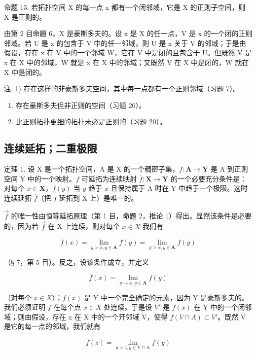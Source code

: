 命题 13. 若拓扑空间 X 的每一点 x 都有一个闭邻域，它是 X 的正则子空间，则 X 是正则的。

由第 2 目命题 6，X 是豪斯多夫的。设 x 是 X 的任一点，V 是 x 的一个闭的正则邻域。若 U 是 x 的包含于 V 中的任一邻域，则 U 是 x 关于 V 的邻域；于是由假设，存在 x 在 V 中的一个邻域 W，它在 V 中是闭的且包含于 U。但既然 V 是 x 在 X 中的邻域，W 就是 x 在 X 中的邻域；又既然 V 在 X 中是闭的，W 就在 X 中是闭的。

注. 1) 存在这样的非豪斯多夫空间，其中每一点都有一个正则邻域（习题 7）。

\begin{enumerate}
\def\labelenumi{\arabic{enumi})}
\setcounter{enumi}{1}
\item
  存在豪斯多夫但非正则的空间（习题 20）。
\item
  比正则拓扑更细的拓扑未必是正则的（习题 20）。
\end{enumerate}

\subsection{连续延拓；二重极限}

定理 1. 设 X 是一个拓扑空间，A 是 X 的一个稠密子集，\(f: \mathbf{A} \to \mathbf{Y}\) 是 A 到正则空间 Y 中的一个映射。\(f\) 可延拓为连续映射 \(\overline{f}: \mathbf{X} \to \mathbf{Y}\) 的一个必要充分条件是：对每个 \(x \in \mathbf{X}\)，\(f(y)\) 当 \(y\) 趋于 \(x\) 且保持属于 A 时在 Y 中趋于一个极限。这时连续延拓 \(\overline{f}\)（把 \(f\) 延拓到 X 上）是唯一的。

\(\vec{f}\) 的唯一性由恒等延拓原理（第 1 目，命题 2，推论 1）得出。显然该条件是必要的，因为若 \(\vec{f}\) 在 X 上连续，则对每个 \(x \in X\) 我们有

\[
\overline {{f}} (x) = \lim _ {y > x, y \in \mathbf {A}} \overline {{f}} (y) = \lim _ {y > x, y \in \mathbf {A}} f (y)
\]

（§ 7，第 5 目）。反之，设该条件成立，并定义

\[
\overline {{f}} (x) = \lim _ {y \rightarrow x, y \in \mathbf {A}} f (y)
\]

（对每个 \(x \in X\)）；\(\overline{f}(x)\) 是 Y 中一个完全确定的元素，因为 Y 是豪斯多夫的。我们必须证明 \(\overline{f}\) 在每个点 \(x \in X\) 处连续。于是设 \(V'\) 是 \(\overline{f}(x)\) 在 Y 中的一个闭邻域；则由假设，存在 x 在 X 中的一个开邻域 V，使得 \(f(V \cap A) \subset V'\)。既然 V 是它的每一点的邻域，我们就有

\[
\overline {{f}} (z) = \lim _ {y > z, y \in \mathrm{V} \cap \mathrm{A}} f (y)
\]

